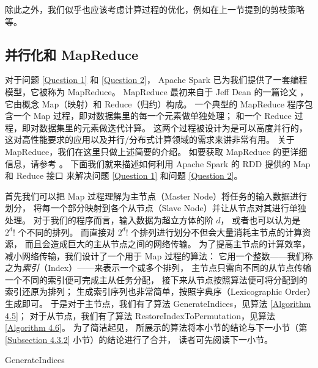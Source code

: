 除此之外，我们似乎也应该考虑计算过程的优化，例如在上一节提到的剪枝策略等。

\subsection{并行化和 MapReduce}
\label{Subsection 4.3.1}

对于问题 \ref{Question 1} 和 \ref{Question 2}，
Apache Spark 已为我们提供了一套编程模型，它被称为 MapReduce。
MapReduce 最初来自于 Jeff Dean 的一篇论文 \cite{Dean.2004}，
它由概念 Map（映射）和 Reduce（归约）构成。
一个典型的 MapReduce 程序包含一个 Map 过程，即对数据集里的每一个元素做单独处理；
和一个 Reduce 过程，即对数据集里的元素做迭代计算。
这两个过程被设计为是可以高度并行的，
这对高性能要求的应用以及并行/分布式计算领域的需求来讲非常有用。
关于 MapReduce，我们在这里只做上述简要的介绍。
如要获取 MapReduce 的更详细信息，请参考 \cite{Dean.2004}。
下面我们就来描述如何利用 Apache Spark 的 RDD 提供的 Map 和 Reduce 接口
来解决问题 \ref{Question 1} 和问题 \ref{Question 2}。

首先我们可以把 Map 过程理解为主节点（Master Node）将任务的输入数据进行划分，
将每一个部分映射到各个从节点（Slave Node）并让从节点对其进行单独处理。
对于我们的程序而言，输入数据为超立方体的阶 $d$，
或者也可以认为是 $2^d !$ 个不同的排列。
而直接对 $2^d !$ 个排列进行划分不但会大量消耗主节点的计算资源，
而且会造成巨大的主从节点之间的网络传输。
为了提高主节点的计算效率，减小网络传输，我们设计了一个用于 Map 过程的算法：
它用一个整数——我们称之为\emph{索引}（Index）——来表示一个或多个排列，
主节点只需向不同的从节点传输一个不同的索引便可完成主从任务分配，
接下来从节点按照算法便可将分配到的索引还原为排列；
生成索引序列也非常简单，按照字典序（Lexicographic Order）生成即可。
于是对于主节点，我们有了算法 GenerateIndices，见算法 \ref{Algorithm 4.5}；
对于从节点，我们有了算法 RestoreIndexToPermutation，见算法 \ref{Algorithm 4.6}。
为了简洁起见，
所展示的算法将本小节的结论与下一小节（第 \ref{Subsection 4.3.2} 小节）的结论进行了合并，
读者可先阅读下一小节。

\begin{algorithm}[h!]
\caption{GenerateIndices}
\label{Algorithm 4.5}
\begin{algorithmic}[1]
	 

	 
\end{algorithmic}
\end{algorithm}

